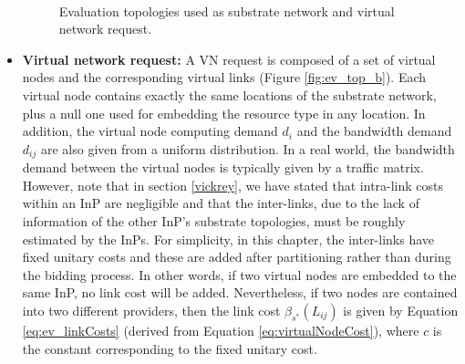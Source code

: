 \begin{itemize}
\begin{figure}[bth]
	\myfloatalign
	 \quad
	 \\
	\caption{Evaluation topologies used as substrate network and virtual network request.}
	\label{fig:ev_top}
\end{figure}

\item \textbf{Virtual network request:} A VN request is composed of a set of virtual nodes and the corresponding virtual links (Figure \ref{fig:ev_top_b}). Each virtual node contains exactly the same locations of the substrate network, plus a null one used for embedding the resource type in any location. In addition, the virtual node computing demand $d_i$ and the bandwidth demand $d_{ij}$ are also given from a uniform distribution. In a real world, the bandwidth demand between the virtual nodes is typically given by a traffic matrix. However, note that in section \ref{vickrey}, we have stated that intra-link costs within an InP are negligible and that the inter-links, due to the lack of information of the other InP's substrate topologies, must be roughly estimated by the InPs. For simplicity, in this chapter, the inter-links have fixed unitary costs and these are added after partitioning rather than during the bidding process. In other words, if two virtual nodes are embedded to the same InP, no link cost will be added. Nevertheless, if two nodes are contained into two different providers, then the link cost $\beta_{s^{*}}(L_{ij})$ is given by Equation \ref{eq:ev_linkCosts} (derived from Equation \ref{eq:virtualNodeCost}), where $c$ is the constant corresponding to the fixed unitary cost.


\end{itemize}
